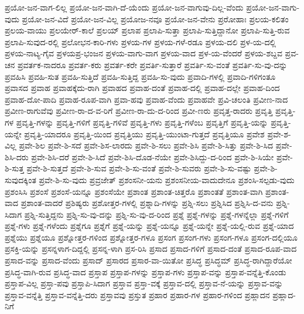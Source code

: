 {ಪ್ರಯೋ-ಜನ-ವಾಗ-ಲಿಲ್ಲ
ಪ್ರಯೋ-ಜನ-ವಾಗಿ-ದೆ-ಯೆಂದು
ಪ್ರಯೋ-ಜನ-ವಾಗುವು-ದಿಲ್ಲ-ವೆಂದು
ಪ್ರಯೋ-ಜನ-ವಾಗು-ವುದು
ಪ್ರಯೋ-ಜನ-ವಿದೆ
ಪ್ರಯೋ-ಜನ-ವಿಲ್ಲ
ಪ್ರಯೋಜ-ನವೂ
ಪ್ರಯೋ-ಜನ-ವೇನು
ಪ್ರರೋಹಾಃ
ಪ್ರಲಯ-ಕಲಿತಂ
ಪ್ರಲಯ-ವಾಯು
ಪ್ರಲಯೇರ್-ಕಾಲೆ
ಪ್ರಲಯ್
ಪ್ರಲಾಪ
ಪ್ರಲಾಪಿ-ಸುತ್ತಾ
ಪ್ರಲಾಪಿ-ಸುತ್ತಿದ್ದಾನೋ
ಪ್ರಲಾಪಿ-ಸುತ್ತಿ-ರುವ
ಪ್ರಲಾಪಿ-ಸುವುದ-ರಲ್ಲಿ
ಪ್ರಲೋಭನ-ಕಾರಿ-ಗಳು
ಪ್ರಳಯ-ಗಳ
ಪ್ರಳಯ-ಗಳೆ-ರಡೂ
ಪ್ರಳಯ-ದಲಿ
ಪ್ರಳ-ಯ-ದಲ್ಲಿ
ಪ್ರಳಯ-ನಾಟ್ಯ-ಗೈವ
ಪ್ರಳಯಪ್ರ-ಭಂಜನ
ಪ್ರಳಯ-ವಾಗು-ವಾಗ
ಪ್ರಳಯ-ವಾದ
ಪ್ರಳ-ಯ-ವೆಂದರೆ
ಪ್ರಳಯ-ಶಬ್ದವ
ಪ್ರವ-ಚನ
ಪ್ರವರ್ತಕ-ನಾದರೂ
ಪ್ರವರ್ತ-ಕರು
ಪ್ರವರ್ತ-ಕರೇ
ಪ್ರವರ್ತಿ-ಸುತ್ತಾರೆ
ಪ್ರವರ್ತಿ-ಸು-ವಂತೆ
ಪ್ರವರ್ತಿ-ಸು-ವು-ದನ್ನು
ಪ್ರವಹಿಸಿ
ಪ್ರವಹಿ-ಸುತ
ಪ್ರವಹಿ-ಸುತ್ತಿದೆ
ಪ್ರವಹಿ-ಸುತ್ತಿದ್ದ
ಪ್ರವಹಿ-ಸು-ವುದು
ಪ್ರವಾದಿ-ಗಳಲ್ಲಿ
ಪ್ರವಾದಿ-ಗಳಿಗಂತೂ
ಪ್ರವಾಸದ
ಪ್ರವಾಹ
ಪ್ರವಾಹಕ್ಕೆದು-ರಾಗಿ
ಪ್ರವಾಹದ
ಪ್ರವಾಹ-ದಂತೆ
ಪ್ರವಾಹ-ದಲ್ಲಿ
ಪ್ರವಾಹ-ದಲ್ಲೇ
ಪ್ರವಾಹ-ದಿಂದ
ಪ್ರವಾಹ-ದೋ-ಪಾದಿ
ಪ್ರವಾಹ-ರೂಪ-ವಾಗಿ
ಪ್ರವಾ-ಹವು
ಪ್ರವಾಹ-ವೆಂದು
ಪ್ರವಾಹವೇ
ಪ್ರವಿ-ಚಲಂತಿ
ಪ್ರವೀಣ-ನಾದ
ಪ್ರವೀಣ-ರಾಗುವೆವು
ಪ್ರವೀಣ-ರಾ-ದ-ವ-ರಿಗೆ
ಪ್ರವೀಣ-ರಾ-ದು-ದ-ರಿಂದ
ಪ್ರವೀ-ಣರು
ಪ್ರವೃತ್ತ-ರಾದರು
ಪ್ರವೃತ್ತಿ
ಪ್ರವೃತ್ತಿ-ಗಳ
ಪ್ರವೃತ್ತಿ-ಗಳನ್ನು
ಪ್ರವೃತ್ತಿ-ಗಳಿಗೆ
ಪ್ರವೃತ್ತಿ-ಗಳಿವೆ
ಪ್ರವೃತ್ತಿ-ಗಳು
ಪ್ರವೃತ್ತಿ-ಗಳೆಂಬ
ಪ್ರವೃತ್ತಿಗೆ
ಪ್ರವೃತ್ತಿ-ಯನ್ನು
ಪ್ರವೃತ್ತಿ-ಯನ್ನೇ
ಪ್ರವೃತ್ತಿ-ಯಾದರೂ
ಪ್ರವೃತ್ತಿ-ಯಿಂದ
ಪ್ರವೃತ್ತಿಯು
ಪ್ರವೃತ್ತಿ-ಯುಂಟಾ-ಗುತ್ತದೆ
ಪ್ರವೃತ್ತಿಯೂ
ಪ್ರವೇಶ
ಪ್ರವೇ-ಶ-ವಿಲ್ಲ
ಪ್ರವೇ-ಶಿಲ
ಪ್ರವೇ-ಶಿ-ಸದೆ
ಪ್ರವೇ-ಶಿಸ-ಲಾರದು
ಪ್ರವೇ-ಶಿ-ಸಲು
ಪ್ರವೇ-ಶಿಸಿ
ಪ್ರವೇ-ಶಿ-ಸಿತ್ತು
ಪ್ರವೇ-ಶಿ-ಸಿದ
ಪ್ರವೇ-ಶಿಸಿ-ದರು
ಪ್ರವೇ-ಶಿಸಿ-ದರೆ
ಪ್ರವೇ-ಶಿ-ಸಿದೆ
ಪ್ರವೇ-ಶಿಸಿ-ದೊಡ-ನೆಯೇ
ಪ್ರವೇ-ಶಿಸಿದ್ದು-ದ-ರಿಂದ
ಪ್ರವೇ-ಶಿ-ಸಿಯೇ
ಪ್ರವೇ-ಶಿ-ಸುತ್ತ
ಪ್ರವೇ-ಶಿ-ಸುತ್ತದೆ
ಪ್ರವೇ-ಶಿ-ಸುವ
ಪ್ರವೇ-ಶಿ-ಸು-ವಂತೆ
ಪ್ರವೇ-ಶಿ-ಸುವರು
ಪ್ರವೇ-ಶಿ-ಸು-ವಷ್ಟು
ಪ್ರವೇ-ಶಿ-ಸುವುದಕ್ಕಿಂತ
ಪ್ರವೇ-ಶಿ-ಸು-ವುದು
ಪ್ರವ್ರಜೇತ್
ಪ್ರಶಂಸನೀ-ಯನು
ಪ್ರಶಂಸನೀಯ-ವಾದುದೇನೂ
ಪ್ರಶಂಸಿ-ಸಲ್ಪಡು-ವುದು
ಪ್ರಶಂಸಿಸಿ
ಪ್ರಶಂಸೆ
ಪ್ರಶಂಸೆ-ಯನ್ನೂ
ಪ್ರಶಂಸೆಯೇ
ಪ್ರಶಾಂತ
ಪ್ರಶಾಂತ-ಚಿತ್ತರೊ
ಪ್ರಶಾಂತತೆ
ಪ್ರಶಾಂತ-ವಾಗಿ
ಪ್ರಶಾಂತ-ವಾದ
ಪ್ರಶಾಂತ-ವಾದರೆ
ಪ್ರಶಿಷ್ಯರು
ಪ್ರಶೋತ್ತರ-ಗಳಲ್ಲಿ
ಪ್ರಶ್ನಾದಿ-ಗಳನ್ನು
ಪ್ರಶ್ನಿ-ಸಲು
ಪ್ರಶ್ನಿಸಿದ
ಪ್ರಶ್ನಿಸಿ-ದ-ವನು
ಪ್ರಶ್ನಿ-ಸಿದಾಗ
ಪ್ರಶ್ನಿ-ಸುತ್ತಿದ್ದನು
ಪ್ರಶ್ನಿ-ಸು-ವು-ದನ್ನು
ಪ್ರಶ್ನಿ-ಸು-ವು-ದ-ರಿಂದ
ಪ್ರಶ್ನೆ
ಪ್ರಶ್ನೆ-ಗಳನ್ನು
ಪ್ರಶ್ನೆ-ಗಳನ್ನೆಲ್ಲಾ
ಪ್ರಶ್ನೆ-ಗಳಿಗೆ
ಪ್ರಶ್ನೆ-ಗಳು
ಪ್ರಶ್ನೆ-ಗಳೆಂದು
ಪ್ರಶ್ನೆಗೂ
ಪ್ರಶ್ನೆಗೆ
ಪ್ರಶ್ನೆ-ಯನ್ನು
ಪ್ರಶ್ನೆ-ಯನ್ನೂ
ಪ್ರಶ್ನೆ-ಯನ್ನೇ
ಪ್ರಶ್ನೆ-ಯಲ್ಲಿ-ರುವ
ಪ್ರಶ್ನೆ-ಯಾದ
ಪ್ರಶ್ನೆಯು
ಪ್ರಶ್ನೆಯೂ
ಪ್ರಶ್ನೋತ್ತರ-ಗಳಿಂದ
ಪ್ರಶ್ನೋತ್ತರ-ಗಳೂ
ಪ್ರಸಂಗ
ಪ್ರಸಂಗ-ಗಳು
ಪ್ರಸಂಗ-ಗಳೂ
ಪ್ರಸಂಗ-ದಲ್ಲಿಯೂ
ಪ್ರಸಕ್ತಿ-ಯನ್ನು
ಪ್ರಸನ್ನಳಾಗ-ದಿದ್ದಲ್ಲಿ
ಪ್ರಸನ್ನ-ಳಾಗಿ
ಪ್ರಸ-ರಿಸಿ
ಪ್ರಸಾದ
ಪ್ರಸಾದ-ಗಳಿಗೆ
ಪ್ರಸಾದ-ದಂತೆ
ಪ್ರಸಾದ-ರೂಪ-ವಾದ
ಪ್ರಸಾದ-ವನ್ನು
ಪ್ರಸಾದ-ವೆಂದು
ಪ್ರಸಾದ್
ಪ್ರಸಾರದ
ಪ್ರಸಾರ-ವಾ-ಯಿತೋ
ಪ್ರಸಿದ್ಧ
ಪ್ರಸಿದ್ಧಮ್
ಪ್ರಸಿದ್ಧ-ರಾಗಿದ್ದಾರೆಯೋ
ಪ್ರಸಿದ್ಧ-ವಾಗಿ-ರುವ
ಪ್ರಸಿದ್ಧ-ವಾದ
ಪ್ರಸ್ತಾಪ
ಪ್ರಸ್ತಾಪ-ಗಳನ್ನು
ಪ್ರಸ್ತಾಪ-ಗಳು
ಪ್ರಸ್ತಾಪ-ವನ್ನು
ಪ್ರಸ್ತಾಪ-ವನ್ನೆತ್ತಿ-ಕೊಂಡು
ಪ್ರಸ್ತಾಪ-ವಿಲ್ಲ
ಪ್ರಸ್ತಾ-ಪವು
ಪ್ರಸ್ತಾಪಿ-ಸಿದಾಗ
ಪ್ರಸ್ತಾವ
ಪ್ರಸ್ತಾ-ವಕ್ಕೆ
ಪ್ರಸ್ತಾವ-ದಲ್ಲಿ
ಪ್ರಸ್ತಾವ-ನೆ-ಯನ್ನು
ಪ್ರಸ್ತಾವ-ವನ್ನು
ಪ್ರಸ್ತಾವ-ವನ್ನೆತ್ತಿ
ಪ್ರಸ್ತಾವ-ವನ್ನೆತ್ತಿ-ದರು
ಪ್ರಸ್ತಾವವು
ಪ್ರಸ್ತುತ
ಪ್ರಹಾರ
ಪ್ರಹಾರ-ಗಳ
ಪ್ರಹಾರ-ಗಳಿಂದ
ಪ್ರಹ್ಲಾದನ
ಪ್ರಹ್ಲಾದ-ನಿಗೆ
}
